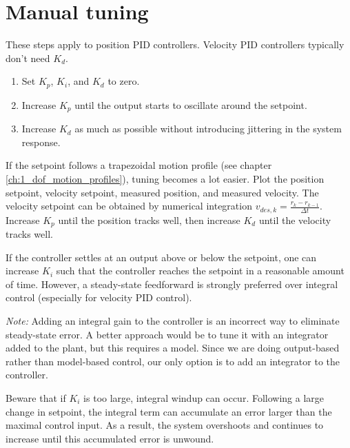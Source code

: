 \section{Manual tuning}

These steps apply to position PID controllers. Velocity PID controllers
typically don't need $K_d$.

\begin{enumerate}
  \item Set $K_p$, $K_i$, and $K_d$ to zero.
  \item Increase $K_p$ until the \gls{output} starts to oscillate around the
    \gls{setpoint}.
  \item Increase $K_d$ as much as possible without introducing jittering in the
    \gls{system response}.
\end{enumerate}

If the \gls{setpoint} follows a trapezoidal motion profile (see chapter
\ref{ch:1_dof_motion_profiles}), tuning becomes a lot easier. Plot the position
\gls{setpoint}, velocity \gls{setpoint}, measured position, and measured
velocity. The velocity \gls{setpoint} can be obtained by numerical integration
$v_{des,k} = \frac{r_k - r_{k-1}}{\Delta t}$. Increase $K_p$ until the position
tracks well, then increase $K_d$ until the velocity tracks well.

If the \gls{controller} settles at an \gls{output} above or below the
\gls{setpoint}, one can increase $K_i$ such that the \gls{controller} reaches
the \gls{setpoint} in a reasonable amount of time. However, a steady-state
feedforward is strongly preferred over integral control (especially for velocity
PID control).

\begin{remark}
  \textit{Note:} Adding an integral gain to the \gls{controller} is an incorrect
  way to eliminate \gls{steady-state error}. A better approach would be to tune
  it with an integrator added to the \gls{plant}, but this requires a
  \gls{model}. Since we are doing output-based rather than model-based control,
  our only option is to add an integrator to the \gls{controller}.
\end{remark}

Beware that if $K_i$ is too large, integral windup can occur. Following a large
change in \gls{setpoint}, the integral term can accumulate an error larger than
the maximal \gls{control input}. As a result, the system overshoots and
continues to increase until this accumulated error is unwound.
